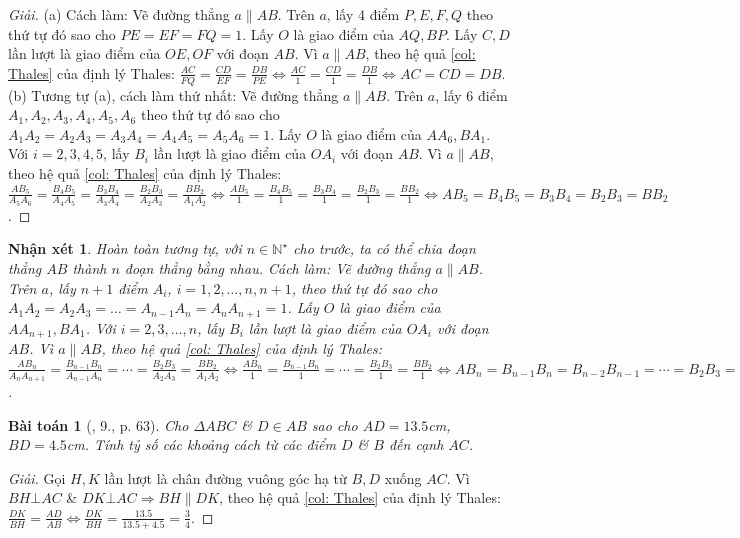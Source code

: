 \documentclass{article}
\newtheorem{baitoan}{Bài toán}
\newtheorem{nhanxet}{Nhận xét}
\begin{document}
\begin{proof}[Giải]
	(a) Cách làm: Vẽ đường thẳng $a\parallel AB$. Trên $a$, lấy 4 điểm $P,E,F,Q$ theo thứ tự đó sao cho $PE = EF = FQ = 1$. Lấy $O$ là giao điểm của $AQ,BP$. Lấy $C,D$ lần lượt là giao điểm của $OE,OF$ với đoạn $AB$. Vì $a\parallel AB$, theo hệ quả \ref{col: Thales} của định lý Thales: $\frac{AC}{FQ} = \frac{CD}{EF} = \frac{DB}{PE}\Leftrightarrow\frac{AC}{1} = \frac{CD}{1} = \frac{DB}{1}\Leftrightarrow AC = CD = DB$. (b) Tương tự (a), cách làm thứ nhất: Vẽ đường thẳng $a\parallel AB$. Trên $a$, lấy 6 điểm $A_1,A_2,A_3,A_4,A_5,A_6$ theo thứ tự đó sao cho $A_1A_2 = A_2A_3 = A_3A_4 = A_4A_5 = A_5A_6 = 1$. Lấy $O$ là giao điểm của $AA_6,BA_1$. Với $i = 2,3,4,5$, lấy $B_i$ lần lượt là giao điểm của $OA_i$ với đoạn $AB$. Vì $a\parallel AB$, theo hệ quả \ref{col: Thales} của định lý Thales: $\frac{AB_5}{A_5A_6} = \frac{B_4B_5}{A_4A_5} = \frac{B_3B_4}{A_3A_4} = \frac{B_2B_3}{A_2A_3} = \frac{BB_2}{A_1A_2}\Leftrightarrow\frac{AB_5}{1} = \frac{B_4B_5}{1} = \frac{B_3B_4}{1} = \frac{B_2B_3}{1} = \frac{BB_2}{1}\Leftrightarrow AB_5 = B_4B_5 = B_3B_4 = B_2B_3 = BB_2$.
\end{proof}

\begin{nhanxet}
	Hoàn toàn tương tự, với $n\in\mathbb{N}^\star$ cho trước, ta có thể chia đoạn thẳng $AB$ thành $n$ đoạn thẳng bằng nhau. Cách làm: Vẽ đường thẳng $a\parallel AB$. Trên $a$, lấy $n+1$ điểm $A_i$, $i = 1,2,\ldots,n,n+1$, theo thứ tự đó sao cho $A_1A_2 = A_2A_3 = \ldots = A_{n-1}A_n = A_nA_{n+1} = 1$. Lấy $O$ là giao điểm của $AA_{n+1},BA_1$. Với $i = 2,3,\ldots,n$, lấy $B_i$ lần lượt là giao điểm của $OA_i$ với đoạn $AB$. Vì $a\parallel AB$, theo hệ quả \ref{col: Thales} của định lý Thales: $\frac{AB_n}{A_nA_{n+1}} = \frac{B_{n-1}B_n}{A_{n-1}A_n} = \cdots = \frac{B_2B_3}{A_2A_3} = \frac{BB_2}{A_1A_2}\Leftrightarrow\frac{AB_n}{1} = \frac{B_{n-1}B_n}{1} = \cdots = \frac{B_2B_3}{1} = \frac{BB_2}{1}\Leftrightarrow AB_n = B_{n-1}B_n = B_{n-2}B_{n-1} = \cdots = B_2B_3 = BB_2$.
\end{nhanxet}

\begin{baitoan}[\cite{SGK_Toan_8_tap_2}, 9., p. 63]
	Cho $\Delta ABC$ \& $D\in AB$ sao cho $AD = 13.5$\emph{cm}, $BD = 4.5$\emph{cm}. Tính tỷ số các khoảng cách từ các điểm $D$ \& $B$ đến cạnh $AC$.
\end{baitoan}

\begin{proof}[Giải]
	Gọi $H,K$ lần lượt là chân đường vuông góc hạ từ $B,D$ xuống $AC$. Vì $BH\bot AC$ \& $DK\bot AC\Rightarrow BH\parallel DK$, theo hệ quả \ref{col: Thales} của định lý Thales: $\frac{DK}{BH} = \frac{AD}{AB}\Leftrightarrow\frac{DK}{BH} = \frac{13.5}{13.5 + 4.5} = \frac{3}{4}$.
\end{proof}
\end{document}
